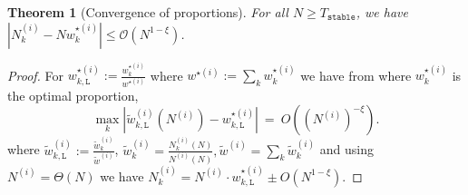 \documentclass{article}
\newtheorem{theorem}{Theorem}
\begin{document}
\begin{theorem}[Convergence of proportions] For all $N\geq T_{\texttt{stable}}$, we have $ |N^{(i)}_k - N w^{\star (i)}_k | \leq \mathcal{O}(N^{1-\xi})$.
   \label{thm:convprop}
\end{theorem}
\begin{proof}
       For $w^{\star (i)}_{k,\texttt{L}}:=\frac{w^{\star (i)}_{k}}{w^{\star (i)}}$  where $w^{\star (i)}:=\sum_kw^{\star (i)}_{k}$ we have from \cite[Proposition 3.1.]{bandyopadhyay2024optimal} where $w^{\star(i)}_k$ is the optimal proportion,\[\max_{k}|\widetilde{w}^{(i)}_{k,\texttt{L}}(N^{(i)})-w^{\star (i)}_{k,\texttt{L}}|~=~O((N^{(i)})^{-\xi}).\] where $\tilde{w}^{(i)}_{k,\texttt{L}}:=\frac{\tilde{w}^{ (i)}_{k}}{\tilde{w}^{(i)}}$, $\tilde{w}^{(i)}_k=\frac{N^{(i)}_k(N)}{N^{(i)}(N)},\tilde{w}^{(i)}=\sum_k\tilde{w}^{(i)}_k$  and using $N^{(i)} = \Theta(N)$ we have $N^{(i)}_k = N^{(i)}\cdot w^{\star (i)}_{k,\texttt{L}}\pm O(N^{1-\xi})$. 



\end{proof}
\end{document}

